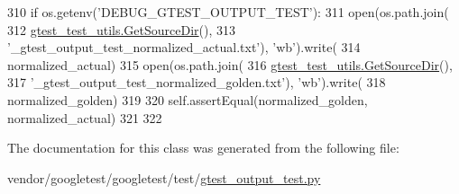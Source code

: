 \begin{DoxyCode}
310       \textcolor{keywordflow}{if} os.getenv(\textcolor{stringliteral}{'DEBUG\_GTEST\_OUTPUT\_TEST'}):
311         open(os.path.join(
312             \hyperlink{namespacegtest__test__utils_aaff66cb0980804d8bd57dc719d4b5518}{gtest\_test\_utils.GetSourceDir}(),
313             \textcolor{stringliteral}{'\_gtest\_output\_test\_normalized\_actual.txt'}), \textcolor{stringliteral}{'wb'}).write(
314                 normalized\_actual)
315         open(os.path.join(
316             \hyperlink{namespacegtest__test__utils_aaff66cb0980804d8bd57dc719d4b5518}{gtest\_test\_utils.GetSourceDir}(),
317             \textcolor{stringliteral}{'\_gtest\_output\_test\_normalized\_golden.txt'}), \textcolor{stringliteral}{'wb'}).write(
318                 normalized\_golden)
319 
320       self.assertEqual(normalized\_golden, normalized\_actual)
321 
322 
\end{DoxyCode}


The documentation for this class was generated from the following file\+:\begin{DoxyCompactItemize}
\item 
vendor/googletest/googletest/test/\hyperlink{gtest__output__test_8py}{gtest\+\_\+output\+\_\+test.\+py}\end{DoxyCompactItemize}
